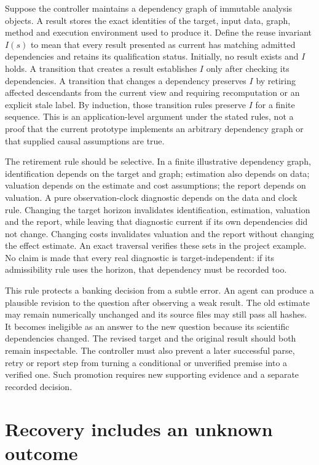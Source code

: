 Suppose the controller maintains a dependency graph of immutable analysis
objects. A result stores the exact identities of the target, input data,
graph, method and execution environment used to produce it. Define the
reuse invariant $I(s)$ to mean that every result presented as current has
matching admitted dependencies and retains its qualification status.
Initially, no result exists and $I$ holds. A transition that creates a
result establishes $I$ only after checking its dependencies. A transition
that changes a dependency preserves $I$ by retiring affected descendants
from the current view and requiring recomputation or an explicit stale
label. By induction, those transition rules preserve $I$ for a finite
sequence. This is an application-level argument under the stated rules,
not a proof that the current prototype implements an arbitrary dependency
graph or that supplied causal assumptions are true. \citep{exec14_l6_exact}

The retirement rule should be selective. In a finite illustrative dependency
graph, identification depends on the target and graph; estimation also
depends on data; valuation depends on the estimate and cost assumptions;
the report depends on valuation. A pure observation-clock diagnostic depends
on the data and clock rule. Changing the target horizon invalidates
identification, estimation, valuation and the report, while leaving that
diagnostic current if its own dependencies did not change. Changing costs
invalidates valuation and the report without changing the effect estimate.
An exact traversal verifies these sets in the project example. No claim is
made that every real diagnostic is target-independent: if its admissibility
rule uses the horizon, that dependency must be recorded too.
\citep{exec14_l6_exact}

This rule protects a banking decision from a subtle error. An agent can
produce a plausible revision to the question after observing a weak result.
The old estimate may remain numerically unchanged and its source files may
still pass all hashes. It becomes ineligible as an answer to the new
question because its scientific dependencies changed. The revised target
and the original result should both remain inspectable. The controller
must also prevent a later successful parse, retry or report step from
turning a conditional or unverified premise into a verified one. Such
promotion requires new supporting evidence and a separate recorded decision.

\section{Recovery includes an unknown outcome}

